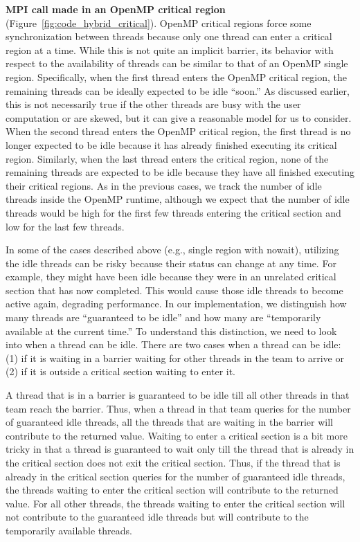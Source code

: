 \vspace{1.0ex}
\noindent\textbf{MPI call made in an OpenMP critical region}
(Figure~\ref{fig:code_hybrid_critical}).  OpenMP critical regions
force some synchronization between threads because only one thread can
enter a critical region at a time.  While this is not quite an
implicit barrier, its behavior with respect to the availability of
threads can be similar to that of an OpenMP single region.
Specifically, when the first thread enters the OpenMP critical region,
the remaining threads can be ideally expected to be idle ``soon.''  As
discussed earlier, this is not necessarily true if the other threads
are busy with the user computation or are skewed, but it can give a
reasonable model for us to consider.  When the second thread enters
the OpenMP critical region, the first thread is no longer expected to
be idle because it has already finished executing its critical region.
Similarly, when the last thread enters the critical region, none of
the remaining threads are expected to be idle because they have all
finished executing their critical regions.  As in the previous cases,
we track the number of idle threads inside the OpenMP runtime,
although we expect that the number of idle threads would be high for
the first few threads entering the critical section and low for the
last few threads.

\vspace{1.0ex}

In some of the cases described above (e.g., single region with
nowait), utilizing the idle threads can be risky because their status
can change at any time.  For example, they might have been idle
because they were in an unrelated critical section that has now
completed.  This would cause those idle threads to become active
again, degrading performance. In our implementation, we distinguish
how many threads are ``guaranteed to be idle'' and how many are
``temporarily available at the current time.''  To understand this
distinction, we need to look into when a thread can be idle.  There
are two cases when a thread can be idle: (1) if it is waiting in a
barrier waiting for other threads in the team to arrive or (2) if it
is outside a critical section waiting to enter it.

A thread that is in a barrier is guaranteed to be idle till all other
threads in that team reach the barrier.  Thus, when a thread in that
team queries for the number of guaranteed idle threads, all the
threads that are waiting in the barrier will contribute to the
returned value.  Waiting to enter a critical section is a bit more
tricky in that a thread is guaranteed to wait only till the thread
that is already in the critical section does not exit the critical
section.  Thus, if the thread that is already in the critical section
queries for the number of guaranteed idle threads, the threads waiting
to enter the critical section will contribute to the returned value.
For all other threads, the threads waiting to enter the critical
section will not contribute to the guaranteed idle threads but will
contribute to the temporarily available threads.

